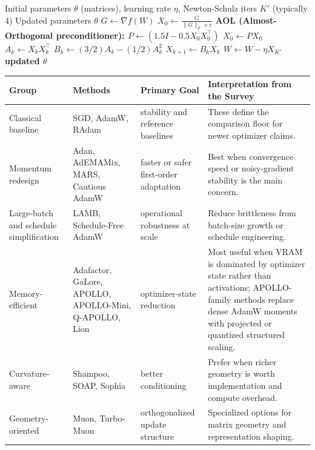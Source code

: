 \documentclass[11pt,a4paper]{article}
\begin{document}
\begin{algorithm}[H]
\caption{Turbo-Muon (AOL-Preconditioned Orthogonalization)}
\label{alg:turbo-muon}
\begin{algorithmic}[1]
\Require Initial parameters $\theta$ (matrices), learning rate $\eta$, Newton-Schulz iters $K'$ (typically 4)
\Ensure Updated parameters $\theta$
    \State $G \gets \nabla f(W)$ 
    \State $X_0 \gets \frac{G}{\|G\|_F + \epsilon}$ 
    \State \bf{AOL (Almost-Orthogonal preconditioner):} 
    \State $P \gets (1.5 I - 0.5 X_0 X_0^\top)$ 
    \State $X_0 \gets P X_0$ 
        \State $A_k \gets X_k X_k^\top$
        \State $B_k \gets (3/2) A_k - (1/2) A_k^2$
        \State $X_{k+1} \gets B_k X_k$ 
    \EndFor
    \State $W \gets W - \eta X_{K'}$ 
\EndFor
\Return updated $\theta$
\end{algorithmic}
\end{algorithm}

\small
\begin{longtable}{p{2.5cm}p{3.5cm}p{2.0cm}p{5.3cm}}
\toprule
\textbf{Group} & \textbf{Methods} & \textbf{Primary Goal} & \textbf{Interpretation from the Survey} \\
\midrule
\endhead
Classical baseline & SGD, AdamW, RAdam & stability and reference baselines & These define the comparison floor for newer optimizer claims. \\
Momentum redesign & Adan, AdEMAMix, MARS, Cautious AdamW & faster or safer first-order adaptation & Best when convergence speed or noisy-gradient stability is the main concern. \\
Large-batch and schedule simplification & LAMB, Schedule-Free AdamW & operational robustness at scale & Reduce brittleness from batch-size growth or schedule engineering. \\
Memory-efficient & Adafactor, GaLore, APOLLO, APOLLO-Mini, Q-APOLLO, Lion & optimizer-state reduction & Most useful when VRAM is dominated by optimizer state rather than activations; APOLLO-family methods replace dense AdamW moments with projected or quantized structured scaling. \\
Curvature-aware & Shampoo, SOAP, Sophia & better conditioning & Prefer when richer geometry is worth implementation and compute overhead. \\
Geometry-oriented & Muon, Turbo-Muon & orthogonalized update structure & Specialized options for matrix geometry and representation shaping. \\
\bottomrule
\end{longtable}
\normalsize
\end{document}

